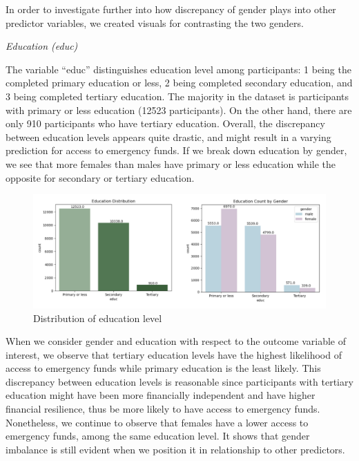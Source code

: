 \documentclass[12pt]{article}
\begin{document}
In order to investigate further into how discrepancy of gender plays
into other predictor variables, we created visuals for contrasting the
two genders.

\emph{Education (educ)}

The variable ``educ'' distinguishes education level among participants:
1 being the completed primary education or less, 2 being completed
secondary education, and 3 being completed tertiary education. The
majority in the dataset is participants with primary or less education
(12523 participants). On the other hand, there are only 910 participants
who have tertiary education. Overall, the discrepancy between education
levels appears quite drastic, and might result in a varying prediction
for access to emergency funds. If we break down education by gender, we
see that more females than males have primary or less education while
the opposite for secondary or tertiary education.

\begin{figure}

{\centering \includegraphics[width=1.1\linewidth]{graphs/f24_graph4} 

}

\caption{Distribution of education level}\label{fig:unnamed-chunk-5}
\end{figure}

When we consider gender and education with respect to the outcome
variable of interest, we observe that tertiary education levels have the
highest likelihood of access to emergency funds while primary education
is the least likely. This discrepancy between education levels is
reasonable since participants with tertiary education might have been
more financially independent and have higher financial resilience, thus
be more likely to have access to emergency funds. Nonetheless, we
continue to observe that females have a lower access to emergency funds,
among the same education level. It shows that gender imbalance is still
evident when we position it in relationship to other predictors.
\end{document}
